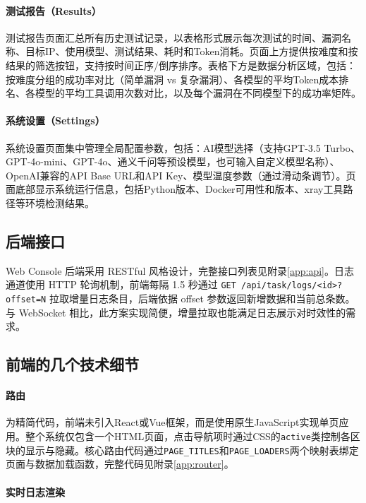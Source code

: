 \paragraph{测试报告（Results）}

测试报告页面汇总所有历史测试记录，以表格形式展示每次测试的时间、漏洞名称、目标IP、使用模型、测试结果、耗时和Token消耗。页面上方提供按难度和按结果的筛选按钮，支持按时间正序/倒序排序。表格下方是数据分析区域，包括：按难度分组的成功率对比（简单漏洞 vs 复杂漏洞）、各模型的平均Token成本排名、各模型的平均工具调用次数对比，以及每个漏洞在不同模型下的成功率矩阵。

\paragraph{系统设置（Settings）}

系统设置页面集中管理全局配置参数，包括：AI模型选择（支持GPT-3.5 Turbo、GPT-4o-mini、GPT-4o、通义千问等预设模型，也可输入自定义模型名称）、OpenAI兼容的API Base URL和API Key、模型温度参数（通过滑动条调节）。页面底部显示系统运行信息，包括Python版本、Docker可用性和版本、xray工具路径等环境检测结果。

\subsection{后端接口}

Web Console 后端采用 RESTful 风格设计，完整接口列表见附录\ref{app:api}。日志通道使用 HTTP 轮询机制，前端每隔 1.5 秒通过 \texttt{GET /api/task/logs/<id>?offset=N} 拉取增量日志条目，后端依据 offset 参数返回新增数据和当前总条数。与 WebSocket 相比，此方案实现简便，增量拉取也能满足日志展示对时效性的需求。

\subsection{前端的几个技术细节}

\paragraph{路由}

为精简代码，前端未引入React或Vue框架，而是使用原生JavaScript实现单页应用。整个系统仅包含一个HTML页面，点击导航项时通过CSS的\texttt{active}类控制各区块的显示与隐藏。核心路由代码通过\texttt{PAGE\_TITLES}和\texttt{PAGE\_LOADERS}两个映射表绑定页面与数据加载函数，完整代码见附录\ref{app:router}。

\paragraph{实时日志渲染}

